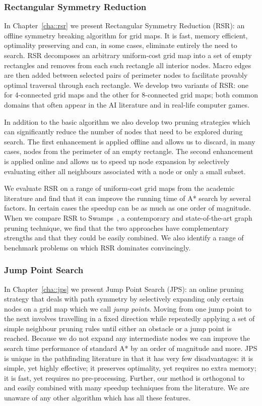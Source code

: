\subsubsection{Rectangular Symmetry Reduction}
\label{cha::intro::contributions::rsr}
In Chapter~\ref{cha::rsr} we present Rectangular Symmetry Reduction (RSR): an
offline symmetry breaking algorithm for grid maps. It is fast, memory
efficient, optimality preserving and can, in some cases, eliminate entirely
the need to search.  RSR decomposes an arbitrary uniform-cost grid map into a
set of empty rectangles and removes from each such rectangle all interior
nodes.  Macro edges are then added between selected pairs of perimeter nodes
to facilitate provably optimal traversal through each rectangle.  We develop
two variants of RSR: one for 4-connected grid maps and the other for
8-connected grid maps; both common domains that often appear in the AI
literature and in real-life computer games.

In addition to the basic algorithm we also develop two pruning strategies
which can significantly reduce the number of nodes that need to be explored
during search.  The first enhancement is applied offline and allows us to
discard, in many cases, nodes from the perimeter of an empty rectangle. The
second enhancement is applied online and allows us to speed up node expansion
by selectively evaluating either all neighbours associated with a node or only
a small subset.

We evaluate RSR on a range of uniform-cost grid maps from the academic
literature and find that it can improve the running time of A{*} search by
several factors. In certain cases the speedup can be as much as one order of
magnitude. When we compare RSR to Swamps~\citep{pochter10}, a contemporary and
state-of-the-art graph pruning technique, we find that the two approaches have
complementary strengths and that they could be easily combined. We also
identify a range of benchmark problems on which RSR dominates convincingly.

\subsubsection{Jump Point Search}
\label{cha::intro::contributions::jps}
In Chapter~\ref{cha::jps} we present Jump Point Search (JPS): an online
pruning strategy that deals with path symmetry by selectively expanding only
certain nodes on a grid map which we call \emph{jump points}.  Moving from one
jump point to the next involves travelling in a fixed direction while
repeatedly applying a set of simple neighbour pruning rules until either an
obstacle or a jump point is reached.  Because we do not expand any
intermediate nodes we can improve the search time performance of standard A{*} by
an order of magnitude and more.  JPS is unique in the pathfinding literature
in that it has very few disadvantages: it is simple, yet highly effective; it
preserves optimality, yet requires no extra memory;  it is fast, yet
requires no pre-processing.  Further, our method is orthogonal to
and easily combined with many speedup techniques from the literature.  We
are unaware of any other algorithm which has all these features.

